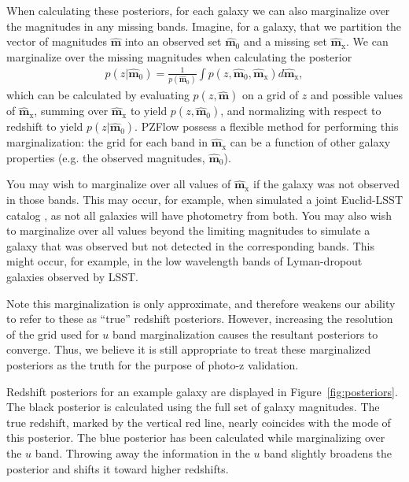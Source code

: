 \documentclass[twocolumn,twocolappendix]{aastex631}
\begin{document}
When calculating these posteriors, for each galaxy we can also marginalize over the magnitudes in any missing bands.
Imagine, for a galaxy, that we partition the vector of magnitudes $\mathbf{\hat{m}}$ into an observed set $\mathbf{\hat{m}}_0$ and a missing set $\mathbf{\hat{m}}_\text{x}$.
We can marginalize over the missing magnitudes when calculating the posterior
\begin{align}
    p(z|\mathbf{\hat{m}}_0) = \frac{1}{p(\mathbf{\hat{m}}_0)} \int p(z, \mathbf{\hat{m}}_0, \mathbf{\hat{m}}_\text{x}) d\mathbf{\hat{m}}_\text{x},
\end{align}
which can be calculated by evaluating $p(z, \mathbf{\hat{m}})$ on a grid of $z$ and possible values of $\mathbf{\hat{m}}_\text{x}$, summing over $\mathbf{\hat{m}}_\text{x}$ to yield $p(z, \mathbf{\hat{m}}_0)$, and normalizing with respect to redshift to yield $p(z|\mathbf{\hat{m}}_0)$.
PZFlow possess a flexible method for performing this marginalization: the grid for each band in $\mathbf{\hat{m}}_\text{x}$ can be a function of other galaxy properties (e.g. the observed magnitudes, $\mathbf{\hat{m}}_0$).

You may wish to marginalize over all values of $\mathbf{\hat{m}}_\text{x}$ if the galaxy was not observed in those bands.
This may occur, for example, when simulated a joint Euclid-LSST catalog \citep{euclid}, as not all galaxies will have photometry from both.
You may also wish to marginalize over all values beyond the limiting magnitudes to simulate a galaxy that was observed but not detected in the corresponding bands.
This might occur, for example, in the low wavelength bands of Lyman-dropout galaxies observed by LSST.

Note this marginalization is only approximate, and therefore weakens our ability to refer to these as ``true'' redshift posteriors.
However, increasing the resolution of the grid used for $u$ band marginalization causes the resultant posteriors to converge.
Thus, we believe it is still appropriate to treat these marginalized posteriors as the truth for the purpose of photo-z validation.

Redshift posteriors for an example galaxy are displayed in Figure~\ref{fig:posteriors}.
The black posterior is calculated using the full set of galaxy magnitudes.
The true redshift, marked by the vertical red line, nearly coincides with the mode of this posterior.
The blue posterior has been calculated while marginalizing over the $u$ band.
Throwing away the information in the $u$ band slightly broadens the posterior and shifts it toward higher redshifts.
\end{document}

